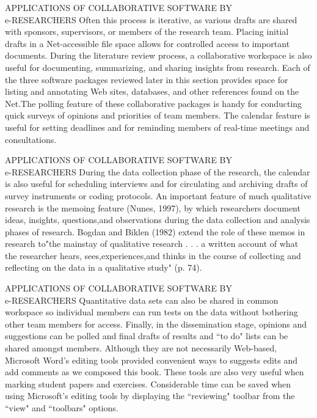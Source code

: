 \documentclass{beamer}
\begin{document}
\begin{frame}[t]{APPLICATIONS OF COLLABORATIVE SOFTWARE BY\\ e-RESEARCHERS}
	Often this process is iterative, as various drafts are shared with sponsors, supervisors, or members of the research team. Placing initial drafts in a Net-accessible file
	space allows for controlled access to important documents. During the literature
	review process, a collaborative workspace is also useful for documenting, summarizing,
	and sharing insights from research. Each of the three software packages reviewed later
	in this section provides space for listing and annotating Web sites, databases, and other
	references found on the Net.The polling feature of these collaborative packages is
	handy for conducting quick surveys of opinions and priorities of team members. The
	calendar feature is useful for setting deadlines and for reminding members of real-time
	meetings and consultations.
\end{frame}


\begin{frame}[t]{APPLICATIONS OF COLLABORATIVE SOFTWARE BY\\ e-RESEARCHERS}
	During the data collection phase of the research, the calendar is also useful for scheduling interviews and for circulating and archiving drafts of
	survey instruments or coding protocols. An important feature of much qualitative
	research is the memoing feature (Nunes, 1997), by which researchers document ideas,
	insights, questions,and observations during the data collection and analysis phases of
	research. Bogdan and Biklen (1982) extend the role of these memos in research to"the
	mainstay of qualitative research . . . a written account of what the researcher hears,
	sees,experiences,and thinks in the course of collecting and reflecting on the data in a
	qualitative study" (p. 74).
\end{frame}


\begin{frame}[t]{APPLICATIONS OF COLLABORATIVE SOFTWARE BY\\ e-RESEARCHERS}
	Quantitative data sets can also be shared in common workspace so individual
	members can run tests on the data without bothering other team members for access.
	Finally, in the dissemination stage, opinions and suggestions can be polled and final
	drafts of results and “to do" lists can be shared amongst members. Although they are
	not necessarily Web-based, Microsoft Word's editing tools provided convenient ways
	to suggests edits and add comments as we composed this book. These tools are also
	very useful when marking student papers and exercises. Considerable time can be saved
	when using Microsoft's editing tools by displaying the “reviewing" toolbar from the
	“view" and “toolbars" options.
\end{frame}
\end{document}
